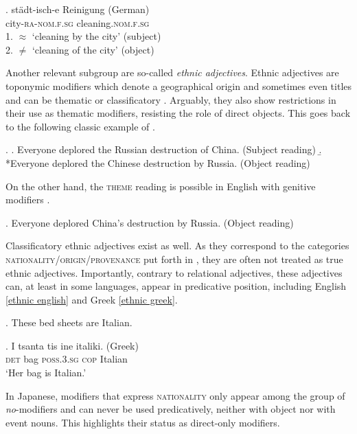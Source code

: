 \documentclass [output=book,colorlinks,citecolor=brown]{langscibook}
\begin{document}
\exg. städt-isch-e Reinigung (German)\\
city-\textsc{ra-nom.f.sg} cleaning.\textsc{nom.f.sg}\\
1. $\approx$ `cleaning by the city' (subject) \\
2. $\neq$ `cleaning of the city' (object) \\ \null \hfill \citep[294]{gunkel:2008:constraints}

Another relevant subgroup are so-called \textit{ethnic adjectives}. Ethnic adjectives are toponymic modifiers which denote a geographical origin and sometimes even titles and can be thematic or classificatory \citep{giorgi:1991:syntax, alex:2011:ea, arseni:2014:EA, kotowski:2016:adj}. Arguably, they also show restrictions in their use as thematic modifiers, resisting the role of direct objects. This goes back to the following classic example of \citet[111]{kayne:1981:ecp}.

\ex. \a. Everyone deplored the Russian destruction of China. (Subject reading)
\b. *Everyone deplored the Chinese destruction by Russia. (Object reading)

On the other hand, the \textsc{theme} reading is possible in English with genitive modifiers \citep{kayne:1981:ecp}.

\ex. Everyone deplored China's destruction by Russia. (Object reading)

Classificatory ethnic adjectives exist as well. As they correspond to the categories \textsc{nationality}/\textsc{origin}/\textsc{provenance} put forth in \citet{sproat:1991:the, scott:2002:stacked, laenzlinger:2005:french, cinque:2010:adj}, they are often not treated as true ethnic adjectives. Importantly, contrary to relational adjectives, these adjectives can, at least in some languages, appear in predicative position, including English \ref{ethnic english} and Greek \ref{ethnic greek}.

\ex. These bed sheets are Italian. \label{ethnic english}

\exg. I tsanta tis ine italiki. (Greek)\\
\textsc{det} bag \textsc{poss.3.sg} \textsc{cop} Italian\\
`Her bag is Italian.' \null \hfill \citep[138]{alex:2011:ea} \label{ethnic greek}

In Japanese, modifiers that express \textsc{nationality} only appear among the group of \textit{no}-modifiers and can never be used predicatively, neither with object nor with event nouns. This highlights their status as direct-only modifiers. %
\end{document}
